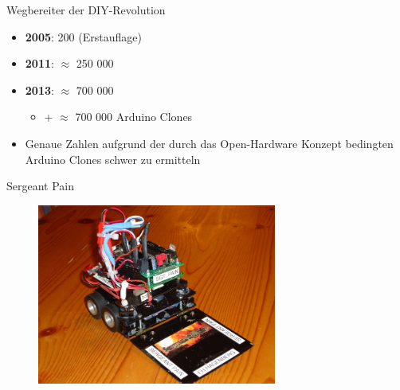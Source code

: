 \documentclass{beamer}
\begin{document}
\begin{frame}{Wegbereiter der DIY-Revolution}
\begin{itemize}
	\item \textbf{2005}: 200 (Erstauflage)\cite{IEEE:2016:TheMakingOfArduino}
\end{itemize}
\begin{itemize}
	\item \textbf{2011}: $\approx$ 250 000\cite{IEEE:2016:TheMakingOfArduino}
\end{itemize}
\begin{itemize}
	\item \textbf{2013}: $\approx$ 700 000\cite{Quora:ArduinoSalesNumbers}
	\begin{itemize}
		\item + $\approx$ 700 000 Arduino Clones
	\end{itemize}
\end{itemize}
\vspace{10px}
\begin{itemize}
	\item Genaue Zahlen aufgrund der durch das Open-Hardware Konzept bedingten Arduino Clones schwer zu ermitteln
\end{itemize}
\end{frame}
\begin{frame}{Sergeant Pain}
 \begin{figure}[H]
  \centering
  \includegraphics[width=0.7\textwidth]{./images/robot-sergeant-pain.jpg}
 \end{figure}
\end{frame}
\end{document}
